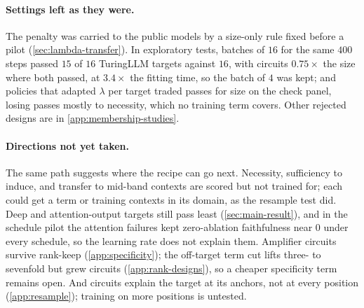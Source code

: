 \paragraph{Settings left as they were.}
The penalty was carried to the public models by a size-only rule fixed before a pilot (\cref{sec:lambda-transfer}).
In exploratory tests, batches of $16$ for the same $400$ steps passed $15$ of $16$ TuringLLM targets against $16$, with circuits $0.75\times$ the size where both passed, at $3.4\times$ the fitting time, so the batch of $4$ was kept; and policies that adapted $\lambda$ per target traded passes for size on the check panel, losing passes mostly to necessity, which no training term covers.
Other rejected designs are in \cref{app:membership-studies}.

\paragraph{Directions not yet taken.}
The same path suggests where the recipe can go next.
Necessity, sufficiency to induce, and transfer to mid-band contexts are scored but not trained for; each could get a term or training contexts in its domain, as the resample test did.
Deep and attention-output targets still pass least (\cref{sec:main-result}), and in the schedule pilot the attention failures kept zero-ablation faithfulness near $0$ under every schedule, so the learning rate does not explain them.
Amplifier circuits survive rank-keep (\cref{app:specificity}); the off-target term cut lifts three- to sevenfold but grew circuits (\cref{app:rank-designs}), so a cheaper specificity term remains open.
And circuits explain the target at its anchors, not at every position (\cref{app:resample}); training on more positions is untested.
\fi\fi\fi
